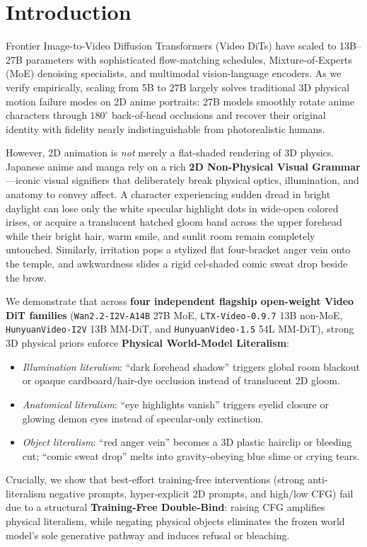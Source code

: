 \documentclass[10pt,twocolumn,letterpaper]{article}
\begin{document}
\section{Introduction}
Frontier Image-to-Video Diffusion Transformers (Video DiTs) have scaled to 13B--27B parameters with sophisticated flow-matching schedules, Mixture-of-Experts (MoE) denoising specialists, and multimodal vision-language encoders. As we verify empirically, scaling from 5B to 27B largely solves traditional 3D physical motion failure modes on 2D anime portraits: 27B models smoothly rotate anime characters through $180^\circ$ back-of-head occlusions and recover their original identity with fidelity nearly indistinguishable from photorealistic humans.

However, 2D animation is \emph{not} merely a flat-shaded rendering of 3D physics. Japanese anime and manga rely on a rich \textbf{2D Non-Physical Visual Grammar}---iconic visual signifiers that deliberately break physical optics, illumination, and anatomy to convey affect. A character experiencing sudden dread in bright daylight can lose only the white specular highlight dots in wide-open colored irises, or acquire a translucent hatched gloom band across the upper forehead while their bright hair, warm smile, and sunlit room remain completely untouched. Similarly, irritation pops a stylized flat four-bracket anger vein onto the temple, and awkwardness slides a rigid cel-shaded comic sweat drop beside the brow.

We demonstrate that across \textbf{four independent flagship open-weight Video DiT families} (\texttt{Wan2.2-I2V-A14B} 27B MoE, \texttt{LTX-Video-0.9.7} 13B non-MoE, \texttt{HunyuanVideo-I2V} 13B MM-DiT, and \texttt{HunyuanVideo-1.5} 54L MM-DiT), strong 3D physical priors enforce \textbf{Physical World-Model Literalism}:
\begin{itemize}
    \item \emph{Illumination literalism}: ``dark forehead shadow'' triggers global room blackout or opaque cardboard/hair-dye occlusion instead of translucent 2D gloom.
    \item \emph{Anatomical literalism}: ``eye highlights vanish'' triggers eyelid closure or glowing demon eyes instead of specular-only extinction.
    \item \emph{Object literalism}: ``red anger vein'' becomes a 3D plastic hairclip or bleeding cut; ``comic sweat drop'' melts into gravity-obeying blue slime or crying tears.
\end{itemize}
Crucially, we show that best-effort training-free interventions (strong anti-literalism negative prompts, hyper-explicit 2D prompts, and high/low CFG) fail due to a structural \textbf{Training-Free Double-Bind}: raising CFG amplifies physical literalism, while negating physical objects eliminates the frozen world model's sole generative pathway and induces refusal or bleaching.
\end{document}
